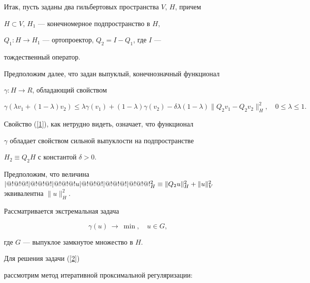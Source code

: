 Итак, пусть заданы два гильбертовых пространства $V$, $H$, причем


$H\subset V$, $H_1$ --- конечномерное подпространство в $H$,


$Q_1:H\to H_1$ --- ортопроектор, $Q_2=I-Q_1$, где $I$ ---


тождественный оператор.





Предположим далее, что задан выпуклый, конечнозначный функционал


$\gamma: H\to R$, обладающий свойством


\begin{equation}\label{1}


\gamma(\lambda


v_1+(1-\lambda)v_2)\le\lambda\gamma(v_1)+(1-\lambda)\gamma(v_2)-


\delta\lambda(1-\lambda)\|Q_2v_1-Q_2v_2\|^2_H,\quad


0\le\lambda\le1.


\end{equation}





Свойство (\ref{1}), как нетрудно видеть, означает, что функционал


$\gamma$ обладает свойством сильной выпуклости на подпространстве


$H_2\equiv Q_2H$ с константой $\delta>0$.





Предположим, что величина $\trivert u\trivert^2_H\equiv


\|Q_2u\|^2_H+\|u\|^2_V$ эквивалентна $\|u\|^2_H$.








Рассматривается экстремальная задача


\begin{equation}\label{2}


\gamma(u)\ \to \ \min, \quad


u\in G,


\end{equation}


где $G$ --- выпуклое замкнутое множество в $H$.


Для решения задачи (\ref{2})


рассмотрим метод итеративной проксимальной регуляризации:





